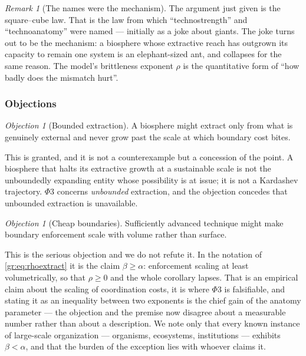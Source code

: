 \documentclass[11pt]{article}
\numberwithin{equation}{section}
\theoremstyle{plain}
\theoremstyle{definition}
\theoremstyle{remark}
\newtheorem{remark}[theorem]{Remark}
\newtheorem{objection}[theorem]{Objection}
\begin{document}
\begin{remark}[The names were the mechanism]\label{gr:rem:namesclosure}
The argument just given is the square--cube law. That is the law from
which ``technostrength'' and ``technoanatomy'' were named --- initially
as a joke about giants. The joke turns out to be the mechanism: a
biosphere whose extractive reach has outgrown its capacity to remain one
system is an elephant-sized ant, and collapses for the same reason. The
model's brittleness exponent $\rho$ is the quantitative form of ``how
badly does the mismatch hurt''.
\end{remark}

\subsubsection{Objections}\label{gr:subsub:objections}

\begin{objection}[Bounded extraction]\label{gr:obj:bounded}
A biosphere might extract only from what is genuinely external and never
grow past the scale at which boundary cost bites.
\end{objection}

\noindent This is granted, and it is not a counterexample but a
concession of the point. A biosphere that halts its extractive growth at
a sustainable scale is not the unboundedly expanding entity whose
possibility is at issue; it is not a Kardashev trajectory. $\Phi3$
concerns \emph{unbounded} extraction, and the objection concedes that
unbounded extraction is unavailable.

\begin{objection}[Cheap boundaries]\label{gr:obj:cheap}
Sufficiently advanced technique might make boundary enforcement scale
with volume rather than surface.
\end{objection}

\noindent This is the serious objection and we do not refute it. In the
notation of \eqref{gr:eq:rhoextract} it is the claim $\beta\ge\alpha$:
enforcement scaling at least volumetrically, so that $\rho\ge0$ and the
whole corollary lapses. That is an empirical claim about the scaling of
coordination costs, it is where $\Phi3$ is falsifiable, and stating it
as an inequality between two exponents is the chief gain of the anatomy
parameter --- the objection and the premise now disagree about a
measurable number rather than about a description. We note only that
every known instance of large-scale organization --- organisms,
ecosystems, institutions --- exhibits $\beta<\alpha$, and that the
burden of the exception lies with whoever claims it.
\end{document}
